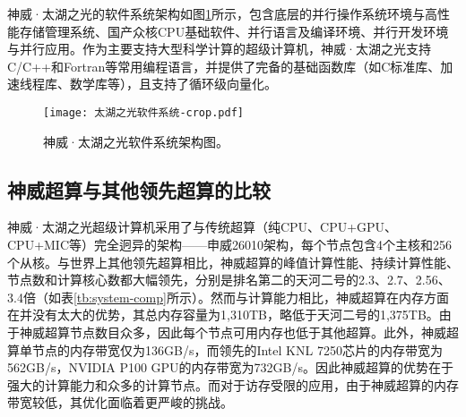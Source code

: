 神威·太湖之光的软件系统架构如图\ref{fig:sunwaysofts}所示，包含底层的并行操作系统环境与高性能存储管理系统、国产众核CPU基础软件、并行语言及编译环境、并行开发环境与并行应用。作为主要支持大型科学计算的超级计算机，神威·太湖之光支持C/C++和Fortran等常用编程语言，并提供了完备的基础函数库（如C标准库、加速线程库、数学库等），且支持了循环级向量化。

\begin{figure}[ht]
\centering
\texttt{[image: 太湖之光软件系统-crop.pdf]}
\caption{神威·太湖之光软件系统架构图。}
\label{fig:sunwaysofts}
\end{figure}

\subsection{神威超算与其他领先超算的比较}

神威·太湖之光超级计算机采用了与传统超算（纯CPU、CPU+GPU、CPU+MIC等）完全迥异的架构——申威26010架构，每个节点包含4个主核和256个从核。与世界上其他领先超算相比，神威超算的峰值计算性能、持续计算性能、节点数和计算核心数都大幅领先，分别是排名第二的天河二号的2.3、2.7、2.56、3.4倍（如表\ref{tb:system-comp}所示）。然而与计算能力相比，神威超算在内存方面在并没有太大的优势，其总内存容量为1,310TB，略低于天河二号的1,375TB。由于神威超算节点数目众多，因此每个节点可用内存也低于其他超算。此外，神威超算单节点的内存带宽仅为136GB/s，而领先的Intel KNL 7250芯片的内存带宽为562GB/s，NVIDIA P100 GPU的内存带宽为732GB/s。因此神威超算的优势在于强大的计算能力和众多的计算节点。而对于访存受限的应用，由于神威超算的内存带宽较低，其优化面临着更严峻的挑战。

\begin{table}[ht]
\centering
\caption{神威·太湖之光超算系统与其他超算系统比较}
\label{tb:system-comp}
\end{table}

